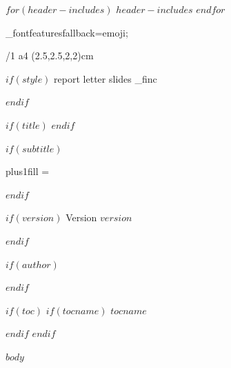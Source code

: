 \useOpTeX

$for(header-includes)$
$header-includes$
$endfor$

\fontfam[lm]

\hyperlinks \Blue \Blue
{}
\initunifonts
\addto\_fontfeatures{fallback=emoji;}
\rm

\def\panauthor#1{\removelastskip\bigskip
  {\leftskip=0pt plus1fill \rightskip=\leftskip \it \noindent #1 \par}\nobreak\bigskip
}

\def\tsup#1{\_raise.8ex\_hbox{\_typosize[7/]#1}}
\def\tsub#1{\_lower.8ex\_hbox{\_typosize[7/]#1}}

\def\newpage{\vfil\supereject}

\def\subtitfont {\scalemain\typoscale[\magstep3/\magstep4]\boldify}

\def\printsubtit #1{%
  {\leftskip=0pt plus1fill \rightskip=\leftskip%
  \subtitfont \noindent \scantextokens{#1}\par}%
  \nobreak\bigskip
}

\def\subtit{\printsubtit}
\def\version #1{%
  {\hfill Version #1}%
}


\margins/1 a4 (2.5,2.5,2,2)cm

\newif\ifreportdefined
\newif\ifletterdefined
\newif\ifslidesdefined


$if(style)$
  {report} {\report\reportdefinedtrue}
  {letter} {\letterdefinedtrue}
  {slides} {\slides\slidesdefinedtrue}
  \_finc {}

$endif$

$if(title)$
$endif$

$if(subtitle)$
  \subtit {$subtitle$}
$endif$

$if(version)$
  \version {$version$}
$endif$

$if(author)$
\ifreportdefined \author{%
  $for(author)$
  $author$ \nl%
  $endfor$
}
\else {}
\fi
$endif$


\newpage

\iniseccc


$if(toc)$
$if(tocname)$
\nonum\notoc\sec $tocname$

$endif$
\maketoc
$endif$

$body$


\bye
